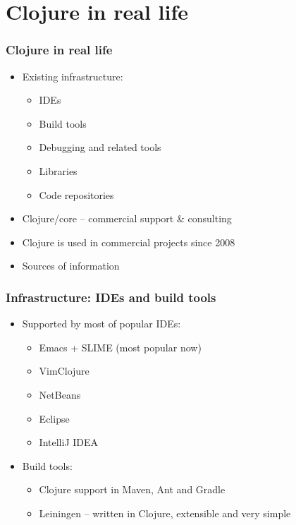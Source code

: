 \section{Clojure in real life}

\begin{frame}[t]
  \frametitle{Clojure in real life}
  \begin{itemize}
  \item Existing infrastructure:
    \begin{itemize}
    \item IDEs
    \item Build tools
    \item Debugging and related tools
    \item Libraries
    \item Code repositories
    \end{itemize}
  \item Clojure/core -- commercial support \& consulting
  \item Clojure is used in commercial projects since 2008
  \item Sources of information
  \end{itemize}
\end{frame}

\begin{frame}[t]
  \frametitle{Infrastructure: IDEs and build tools}
  \begin{itemize}
  \item Supported by most of popular IDEs:
  \begin{itemize}
  \item Emacs + SLIME (most popular now)
  \item VimClojure
  \item NetBeans
  \item Eclipse
  \item IntelliJ IDEA
  \end{itemize}
  \item Build tools:
    \begin{itemize}
    \item Clojure support in Maven, Ant and Gradle
    \item Leiningen -- written in Clojure, extensible and very simple
    \end{itemize}
  \end{itemize}
\end{frame}

